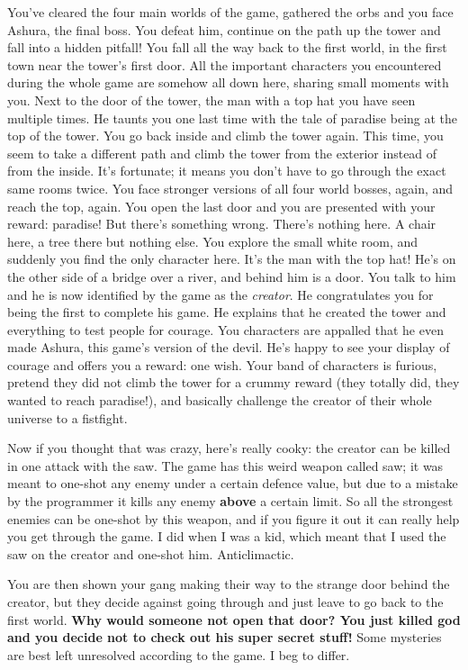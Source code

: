 \documentclass{book}
\begin{document}
You’ve cleared the four main worlds of the game, gathered the orbs and you face Ashura, the final boss. You defeat him, continue on the path up the tower and fall into a hidden pitfall! You fall all the way back to the first world, in the first town near the tower’s first door. All the important characters you encountered during the whole game are somehow all down here, sharing small moments with you. Next to the door of the tower, the man with a top hat you have seen multiple times. He taunts you one last time with the tale of paradise being at the top of the tower. You go back inside and climb the tower again. This time, you seem to take a different path and climb the tower from the exterior instead of from the inside. It’s fortunate; it means you don’t have to go through the exact same rooms twice. You face stronger versions of all four world bosses, again, and reach the top, again. You open the last door and you are presented with your reward: paradise! But there’s something wrong. There’s nothing here. A chair here, a tree there but nothing else. You explore the small white room, and suddenly you find the only character here. It’s the man with the top hat! He’s on the other side of a bridge over a river, and behind him is a door. You talk to him and he is now identified by the game as the \emph{creator}. He congratulates you for being the first to complete his game. He explains that he created the tower and everything to test people for courage. You characters are appalled that he even made Ashura, this game’s version of the devil. He’s happy to see your display of courage and offers you a reward: one wish. Your band of characters is furious, pretend they did not climb the tower for a crummy reward (they totally did, they wanted to reach paradise!), and basically challenge the creator of their whole universe to a fistfight.

Now if you thought that was crazy, here’s really cooky: the creator can be killed in one attack with the saw. The game has this weird weapon called saw; it was meant to one-shot any enemy under a certain defence value, but due to a mistake by the programmer it kills any enemy \textbf{above} a certain limit. So all the strongest enemies can be one-shot by this weapon, and if you figure it out it can really help you get through the game. I did when I was a kid, which meant that I used the saw on the creator and one-shot him. Anticlimactic.

You are then shown your gang making their way to the strange door behind the creator, but they decide against going through and just leave to go back to the first world. \textbf{Why would someone not open that door? You just killed god and you decide not to check out his super secret stuff!} Some mysteries are best left unresolved according to the game. I beg to differ.
\end{document}
